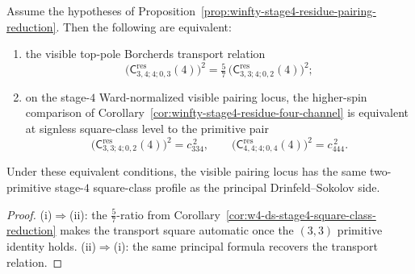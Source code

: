 \begin{corollary}
\label{cor:winfty-stage4-visible-borcherds-two-primitive}
Assume the hypotheses of
Proposition~\ref{prop:winfty-stage4-residue-pairing-reduction}. Then
the following are equivalent:
\begin{enumerate}[label=\textup{(\roman*)}]
\item the visible top-pole Borcherds transport relation
 \[
 \bigl(\mathsf{C}^{\mathrm{res}}_{3,4;4;0,3}(4)\bigr)^2
 =
 \tfrac{5}{7}\,
 \bigl(\mathsf{C}^{\mathrm{res}}_{3,3;4;0,2}(4)\bigr)^2;
 \]
\item on the stage-$4$ Ward-normalized visible pairing locus, the
 higher-spin comparison of
 Corollary~\ref{cor:winfty-stage4-residue-four-channel} is equivalent
 at signless square-class level to the primitive pair
 \[
 \bigl(\mathsf{C}^{\mathrm{res}}_{3,3;4;0,2}(4)\bigr)^2
 =
 c_{334}^{\,2},
 \qquad
 \bigl(\mathsf{C}^{\mathrm{res}}_{4,4;4;0,4}(4)\bigr)^2
 =
 c_{444}^{\,2}.
 \]
\end{enumerate}
Under these equivalent conditions, the visible pairing locus has the
same two-primitive stage-$4$ square-class profile as the principal
Drinfeld--Sokolov side.
\end{corollary}

\begin{proof}
\textup{(i)}$\Rightarrow$\textup{(ii)}: the $\tfrac{5}{7}$-ratio from Corollary~\ref{cor:w4-ds-stage4-square-class-reduction} makes the transport square automatic once the $(3,3)$ primitive identity holds. \textup{(ii)}$\Rightarrow$\textup{(i)}: the same principal formula recovers the transport relation.
\end{proof}

